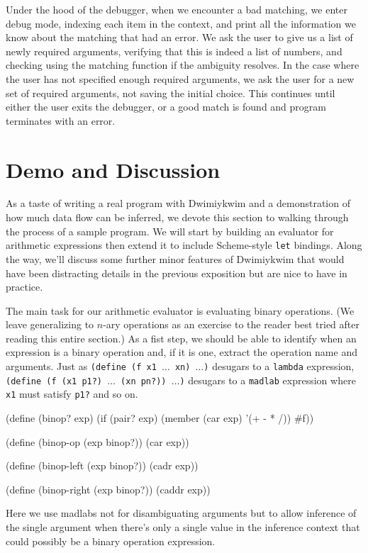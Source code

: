 \documentclass[11pt]{article}
\begin{document}
Under the hood of the debugger, when we encounter a bad matching,
we enter debug mode, indexing each item in the context,
and print all the information we know about the matching that had an error.
We ask the user to give us a list of newly required arguments,
verifying that this is indeed a list of numbers,
and checking using the matching function if the ambiguity resolves.
In the case where the user has not specified enough required arguments,
we ask the user for a new set of required arguments,
not saving the initial choice.
This continues until either the user exits the debugger,
or a good match is found and program terminates with an error.


\section{Demo and Discussion}

As a taste of writing a real program with Dwimiykwim
and a demonstration of how much data flow can be inferred,
we devote this section to walking through the process of a sample program.
We will start by building an evaluator for arithmetic expressions
then extend it to include Scheme-style \texttt{let} bindings.
Along the way, we'll discuss some further minor features of Dwimiykwim
that would have been distracting details in the previous exposition
but are nice to have in practice.

The main task for our arithmetic evaluator is evaluating binary operations.
(We leave generalizing to $n$-ary operations as an exercise to the reader
best tried after reading this entire section.)
As a fist step, we should be able to identify
when an expression is a binary operation
and, if it is one, extract the operation name and arguments.
Just as \texttt{(define (f x1 $\dots$ xn) $\dots$)}
desugars to a \texttt{lambda} expression,
\texttt{(define (f (x1 p1?) $\dots$ (xn pn?)) $\dots$)}
desugars to a \texttt{madlab} expression
where \texttt{x1} must satisfy \texttt{p1?} and so on.
\begin{verbbox}
(define (binop? exp)
  (if (pair? exp)
      (member (car exp) '(+ - * /))
      #f))

(define (binop-op (exp binop?))
  (car exp))

(define (binop-left (exp binop?))
  (cadr exp))

(define (binop-right (exp binop?))
  (caddr exp))
\end{verbbox}
\begin{quote}\theverbbox\end{quote}
Here we use madlabs not for disambiguating arguments
but to allow inference of the single argument
when there's only a single value in the inference context
that could possibly be a binary operation expression.
\end{document}

